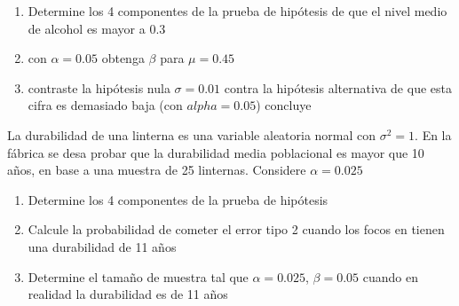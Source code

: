 \documentclass[addpoints]{exam}
\theoremstyle{mytheor}
\begin{document}
\begin{questions}
\begin{enumerate}
  \item Determine los 4 componentes de la prueba de hipótesis de que el nivel medio de alcohol es mayor a 0.3
  \item con $\alpha = 0.05$ obtenga $\beta$ para $\mu = 0.45$
  \item contraste la hipótesis nula $\sigma = 0.01$ contra la hipótesis alternativa de que esta cifra es demasiado baja (con $alpha = 0.05$) concluye
\end{enumerate}

\question La durabilidad de una linterna es una variable aleatoria normal con $\sigma^2 = 1$. En la fábrica se desa probar que la durabilidad media poblacional es mayor que 10 años, en base a una muestra de 25 linternas. Considere $\alpha = 0.025$

\begin{enumerate}
  \item Determine los 4 componentes de la prueba de hipótesis
  \item Calcule la probabilidad de cometer el error tipo 2 cuando los focos en  tienen una durabilidad de 11 años
  \item Determine el tamaño de muestra tal que $\alpha = 0.025$, $\beta = 0.05$ cuando en realidad la durabilidad es de 11 años
\end{enumerate}



\end{questions}
  
\end{document}
